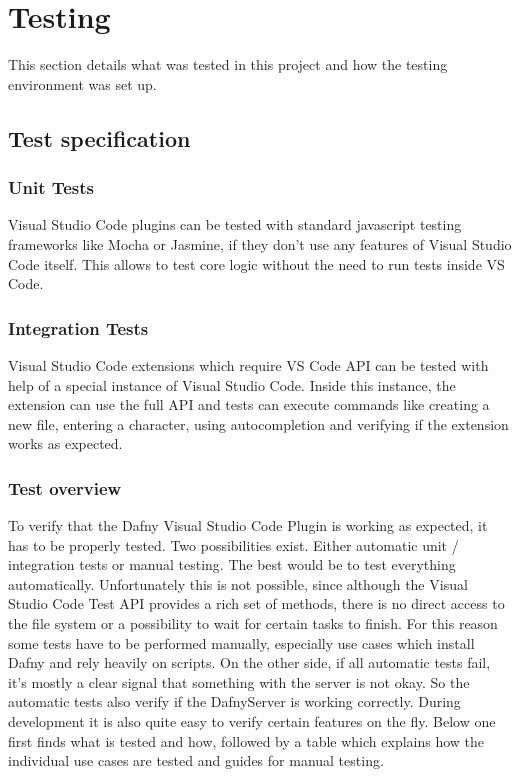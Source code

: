 \section{Testing}
This section details what was tested in this project and how the testing environment was set up.

\subsection{Test specification}

\subsubsection{Unit Tests}
Visual Studio Code plugins can be tested with standard javascript testing frameworks like Mocha or Jasmine, if they don't use any features of Visual Studio Code itself. This allows to test core logic without the need to run tests inside VS Code.

\subsubsection{Integration Tests}
Visual Studio Code extensions which require VS Code API can be tested with help of a special instance of Visual Studio Code. Inside this instance, the extension can use the full API and tests can execute commands like creating a new file, entering a character, using autocompletion and verifying if the extension works as expected.   

\subsubsection{Test overview}
To verify that the Dafny Visual Studio Code Plugin is working as expected, it has to be properly tested. Two possibilities exist. Either automatic unit / integration tests or manual testing. The best would be to test everything automatically. Unfortunately this is not possible, since although the Visual Studio Code Test API provides a rich set of methods, there is no direct access to the file system or a possibility to wait for certain tasks to finish. For this reason some tests have to be performed manually, especially use cases which install Dafny and rely heavily on scripts. On the other side, if all automatic tests fail, it's mostly a clear signal that something with the server is not okay. So the automatic tests also verify if the DafnyServer is working correctly. During development it is also quite easy to verify certain features on the fly. 
Below one first finds what is tested and how, followed by a table which explains how the individual use cases are tested and guides for manual testing. 

